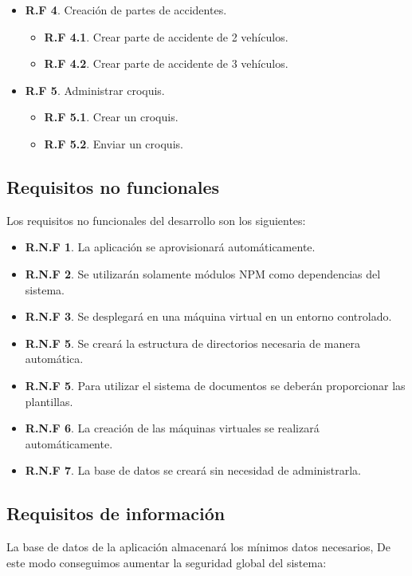 \begin{itemize}
	\item \textbf{R.F 4}. Creación de partes de accidentes.
	\begin{itemize}
		\item \textbf{R.F 4.1}. Crear parte de accidente de 2 vehículos.
		\item \textbf{R.F 4.2}. Crear parte de accidente de 3 vehículos.
	\end{itemize}

	\item \textbf{R.F 5}. Administrar croquis.
	\begin{itemize}
		\item \textbf{R.F 5.1}. Crear un croquis.
		\item \textbf{R.F 5.2}. Enviar un croquis.
	\end{itemize}


\end{itemize}

\subsection{Requisitos no funcionales}
Los requisitos no funcionales del desarrollo son los siguientes: 

\begin{itemize}
	\item \textbf{R.N.F 1}. La aplicación se aprovisionará automáticamente.
	\item \textbf{R.N.F 2}. Se utilizarán solamente módulos NPM como dependencias del sistema. 
	\item \textbf{R.N.F 3}. Se desplegará en una máquina virtual en un entorno controlado.
	\item \textbf{R.N.F 5}. Se creará la estructura de directorios necesaria de manera automática. 
	\item \textbf{R.N.F 5}. Para utilizar el sistema de documentos se deberán proporcionar las plantillas.
	\item \textbf{R.N.F 6}. La creación de las máquinas virtuales se realizará automáticamente.
	\item \textbf{R.N.F 7}. La base de datos se creará sin necesidad de administrarla.
\end{itemize}

\subsection{Requisitos de información}
La base de datos de la aplicación almacenará los mínimos datos necesarios, De este modo conseguimos aumentar la seguridad global del sistema:


